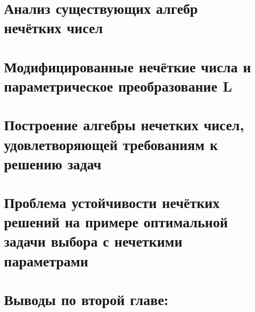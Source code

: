 \newpage
\section{Анализ существующих алгебр нечётких чисел}
\label{chapter2_1}


\section{Модифицированные нечёткие числа и параметрическое преобразование L}
\label{chapter2_2}


\section{Построение алгебры нечетких чисел, удовлетворяющей требованиям к решению задач} 
\label{chapter2_3}


\section{Проблема устойчивости нечётких решений на примере оптимальной задачи выбора с нечеткими параметрами} 
\label{chapter2_4}


\newpage
\section*{Выводы по второй главе:} 
\label{chapter2_5}
